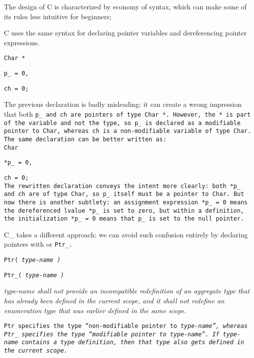 The design of C is characterized by economy of syntax,
which can make some of its rules less intuitive for beginners;

\example C uses the same syntax for declaring
pointer variables and dereferencing pointer expressions.

\tt{Char *}

\tt{p_ = 0,}

\tt{ch = 0;}

The previous declaration is badly misleading: it can create a wrong
impression that both \tt{p_} and \tt{ch} are pointers of type \tt{Char *}.
However, the \tt{*} is part of the variable and not the type,
so \tt{p_} is declared as a modifiable pointer to \tt{Char},
whereas \tt{ch} is a non-modifiable variable of type \tt{Char}.
The same declaration can be better written as:\\

\tt{Char}

\tt{*p_ = 0,}

\s\tt{ch = 0;}\\

The rewritten declaration conveys the intent more clearly:
both \tt{*p_} and \tt{ch} are of type \tt{Char},
so \tt{p_} itself must be a pointer to \tt{Char}.
But now there is another subtlety: an assignment expression \tt{*p_ = 0} means
the dereferenced lvalue \tt{*p_} is set to zero, but within a definition,
the initialization \tt{*p_ = 0} means that \tt{p_} is set to the null pointer.

C\_ takes a different approach: we can avoid such confusion
entirely by declaring pointers with  or \tt{Ptr_}.


\tt{Ptr}\s\s\tt{(} \it{type-name} \tt{)}

\tt{Ptr}\_\s\tt{(} \it{type-name} \tt{)}


\it{type-name} shall not provide an incompatible redefinition of an aggregate
type that has already been defined in the current scope, and it shall not
redefine an enumeration type that was earlier defined in the same scope.


\tt{Ptr} specifies the type ``non-modifiable pointer to \it{type-name}'',
whereas \tt{Ptr_} specifies the type ``modifiable pointer to \it{type-name}''.
If \it{type-name} contains a type definition,
then that type also gets defined in the current scope.

